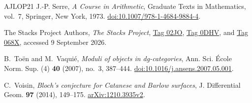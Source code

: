 \begin{thebibliography}{AJLOP21}
J.-P. Serre, \emph{A Course in Arithmetic},
Graduate Texts in Mathematics, vol.~7, Springer, New York, 1973.
\href{https://doi.org/10.1007/978-1-4684-9884-4}{doi:10.1007/978-1-4684-9884-4}.

The Stacks Project Authors, \emph{The Stacks Project},
\href{https://stacks.math.columbia.edu/tag/02JO}{Tag 02JO},
\href{https://stacks.math.columbia.edu/tag/0DHV}{Tag 0DHV}, and
\href{https://stacks.math.columbia.edu/tag/068X}{Tag 068X},
accessed 9 September 2026.

B.~To\"en and M.~Vaqui\'e, \emph{Moduli of objects in dg-categories},
Ann. Sci. \'Ecole Norm. Sup. (4) \textbf{40} (2007), no.~3, 387--444.
\href{https://doi.org/10.1016/j.ansens.2007.05.001}{doi:10.1016/j.ansens.2007.05.001}.

C.~Voisin,
\emph{Bloch's conjecture for Catanese and Barlow surfaces},
J. Differential Geom. \textbf{97} (2014), 149--175.
\href{https://arxiv.org/abs/1210.3935v2}{arXiv:1210.3935v2}.

\end{thebibliography}
